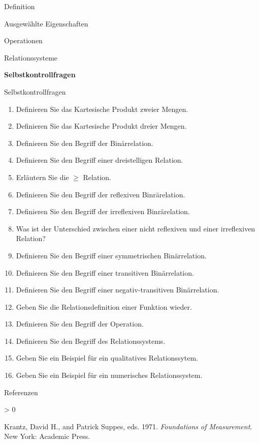 \documentclass[
  8pt,
  ignorenonframetext,
]{beamer}
\providecommand{\tightlist}{%
  \setlength{\itemsep}{0pt}\setlength{\parskip}{0pt}}
\newlength{\cslhangindent}
\newenvironment{CSLReferences}[2] %
 {%
  \setlength{\parindent}{0pt}
  \ifodd #1 \everypar{\setlength{\hangindent}{\cslhangindent}}\ignorespaces\fi
  \ifnum #2 > 0
  \setlength{\parskip}{#2\baselineskip}
  \fi
 }%
 {}
\begin{document}
\begin{frame}{}
\protect\hypertarget{section-7}{}
\vfill
\Large

Definition

Ausgewählte Eigenschaften

Operationen

Relationssysteme

\textbf{Selbstkontrollfragen} \vfill
\end{frame}

\begin{frame}{Selbstkontrollfragen}
\protect\hypertarget{selbstkontrollfragen}{}

\footnotesize

\begin{enumerate}
\tightlist
\item
  Definieren Sie das Kartesische Produkt zweier Mengen.
\item
  Definieren Sie das Kartesische Produkt dreier Mengen.
\item
  Definieren Sie den Begriff der Binärrelation.
\item
  Definieren Sie den Begriff einer dreistelligen Relation.
\item
  Erläutern Sie die \(\ge\) Relation.
\item
  Definieren Sie den Begriff der reflexiven Binrärelation.
\item
  Definieren Sie den Begriff der irreflexiven Binrärelation.
\item
  Was ist der Unterschied zwischen einer nicht reflexiven und einer
  irreflexiven Relation?
\item
  Definieren Sie den Begriff einer symmetrischen Binärrelation.
\item
  Definieren Sie den Begriff einer transitiven Binärrelation.
\item
  Definieren Sie den Begriff einer negativ-transitiven Binärrelation.
\item
  Geben Sie die Relationsdefinition einer Funktion wieder.
\item
  Definieren Sie den Begriff der Operation.
\item
  Definieren Sie den Begriff des Relationssystems.
\item
  Geben Sie ein Beispiel für ein qualitatives Relationssytem.
\item
  Geben Sie ein Beispiel für ein numerisches Relationssystem.
\end{enumerate}
\end{frame}

\begin{frame}{Referenzen}
\protect\hypertarget{referenzen}{}
\footnotesize

\hypertarget{refs}{}
\begin{CSLReferences}{1}{0}
\leavevmode\hypertarget{ref-krantz_1971}{}%
Krantz, David H., and Patrick Suppes, eds. 1971. \emph{Foundations of
Measurement}. {New York}: {Academic Press}.

\end{CSLReferences}
\end{frame}
\end{document}
